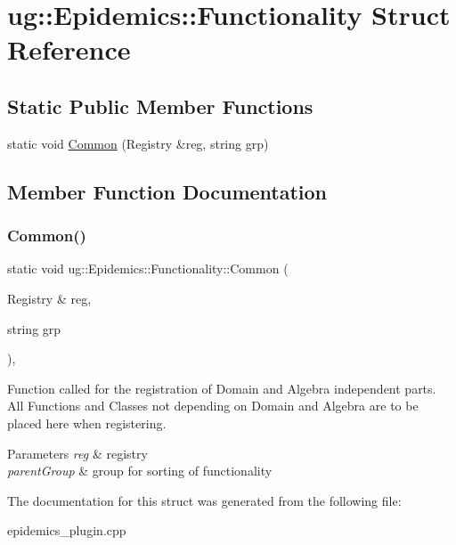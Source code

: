 \hypertarget{structug_1_1_epidemics_1_1_functionality}{}\section{ug\+:\+:Epidemics\+:\+:Functionality Struct Reference}
\label{structug_1_1_epidemics_1_1_functionality}
\subsection*{Static Public Member Functions}
\begin{DoxyCompactItemize}
\item 
static void \hyperlink{structug_1_1_epidemics_1_1_functionality_ad9dde81d1e2732b713f22264975219ed}{Common} (Registry \&reg, string grp)
\end{DoxyCompactItemize}


\subsection{Member Function Documentation}
\mbox{\label{structug_1_1_epidemics_1_1_functionality_ad9dde81d1e2732b713f22264975219ed}} 
\subsubsection{\texorpdfstring{Common()}{Common()}}
{\footnotesize\ttfamily static void ug\+::\+Epidemics\+::\+Functionality\+::\+Common (\begin{DoxyParamCaption}\item[{Registry \&}]{reg,  }\item[{string}]{grp }\end{DoxyParamCaption})\hspace{0.3cm}{\ttfamily [inline]}, {\ttfamily [static]}}

Function called for the registration of Domain and Algebra independent parts. All Functions and Classes not depending on Domain and Algebra are to be placed here when registering.


\begin{DoxyParams}{Parameters}
{\em reg} & registry \\
\hline
{\em parent\+Group} & group for sorting of functionality \\
\hline
\end{DoxyParams}


The documentation for this struct was generated from the following file\+:\begin{DoxyCompactItemize}
\item 
epidemics\+\_\+plugin.\+cpp\end{DoxyCompactItemize}
